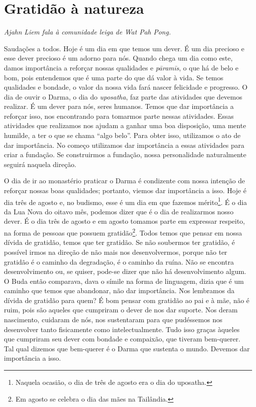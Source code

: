 
\chapter{Gratidão à natureza}

{\itshape
Ajahn Liem fala à comunidade leiga de Wat Pah Pong.}

Saudações a todos. Hoje é um dia em que temos um dever. É um dia
precioso e esse dever precioso é um adorno para nós. Quando chega um
dia como este, damos importância a reforçar nossas qualidades e
\textit{pāramīs}, o que há de belo e bom, pois entendemos que é
uma parte do que dá valor à vida. Se temos qualidades e bondade, o
valor da nossa vida fará nascer felicidade e progresso. O dia de ouvir
o Darma, o dia do \textit{uposatha}, faz parte das atividades que
devemos realizar. É um dever para nós, seres humanos. Temos que dar
importância a reforçar isso, nos encontrando para tomarmos parte nessas
atividades. Essas atividades que realizamos nos ajudam a ganhar uma boa
disposição, uma mente humilde, a ter o que se chama “algo belo”. Para
obter isso, utilizamos o ato de dar importância. No começo utilizamos
dar importância a essas atividades para criar a fundação. Se
construirmos a fundação, nossa personalidade naturalmente seguirá
naquela direção. 

O dia de ir ao monastério praticar o Darma é condizente com nossa
intenção de reforçar nossas boas qualidades; portanto, viemos dar
importância a isso. Hoje é dia três de agosto e, no budismo, esse é um
dia em que fazemos mérito\footnote{Naquela ocasião, o dia de três de
agosto era o dia do uposatha.}. É o dia da Lua Nova do oitavo mês,
podemos dizer que é o dia de realizarmos nosso dever. É o dia três de
agosto e em agosto tomamos parte em expressar respeito, na forma de
pessoas que possuem gratidão\footnote{Em agosto se celebra o dia das
mães na Tailândia.}. Todos temos que pensar em nossa dívida de
gratidão, temos que ter gratidão. Se não soubermos ter gratidão, é
possível irmos na direção de não mais nos desenvolvermos, porque não
ter gratidão é o caminho da degradação, é o caminho da ruína. Não se
encontra desenvolvimento ou, se quiser, pode-se dizer que não há
desenvolvimento algum. O Buda então comparava, dava o símile na forma
de linguagem, dizia que é um caminho que temos que abandonar, não dar
importância. Nos lembramos da dívida de gratidão para quem? É bom
pensar com gratidão ao pai e à mãe, não é ruim, pois são aqueles que
cumpriram o dever de nos dar suporte. Nos deram nascimento, cuidaram de
nós, nos sustentaram para que pudéssemos nos desenvolver tanto
fisicamente como intelectualmente. Tudo isso graças àqueles que
cumpriram seu dever com bondade e compaixão, que tiveram bem-querer.
Tal qual dizemos que bem-querer é o Darma que sustenta o mundo. Devemos
dar importância a isso. 

